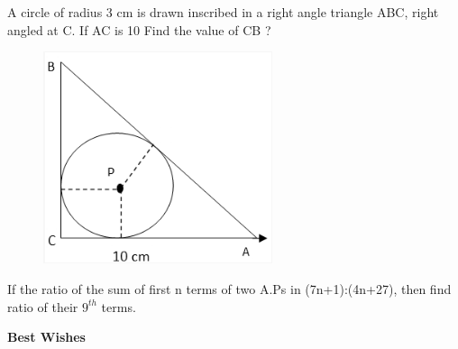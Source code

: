 \documentclass[11pt, a4paper]{exam}
\begin{document}
\begin{questions}
	\pointsdroppedatright
	\question
  
A circle of radius 3 cm is drawn inscribed in a right angle triangle ABC, right angled at C. If AC is 10 Find the value of CB ?
 	\begin{figure}[h!]
	\centering
	\includegraphics[width=0.6\textwidth]{figs/3.png}
	\end{figure}



	\question
If the ratio of the sum of first n terms of two A.Ps in (7n+1):(4n+27), then find ratio of their $9^{th}$ terms.

\end{questions}
\vspace{0.1in}
{\large \bfseries Best Wishes}
\end{document}
